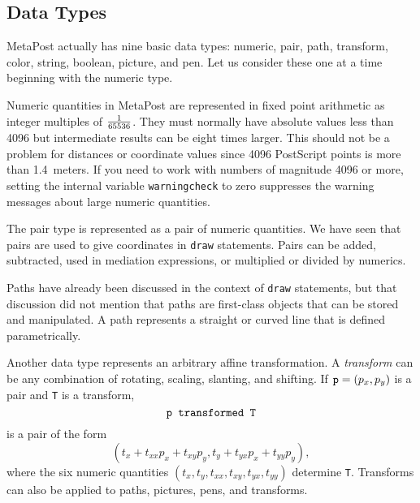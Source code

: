 \documentclass{article} %
\begin{document}
\subsection{Data Types}

MetaPost actually has nine basic data types: numeric,
pair, path, transform,
color, string, boolean, picture, and pen.  Let us consider these one at a time
beginning with the numeric type.

Numeric quantities in MetaPost are represented in fixed
point arithmetic as
integer multiples of $1\over65536$.  They must normally have absolute values
less than 4096 but intermediate results can be eight times larger.
This should not be a problem for distances or coordinate values since 4096
PostScript points is more than 1.4~meters.  If you need to work with numbers
of magnitude 4096 or more, setting the internal variable
{\tt warningcheck}\label{Dwarncheck} to zero
suppresses the warning messages about large numeric quantities.

The pair type is represented as a pair of numeric
quantities.  We have seen that pairs are used to give coordinates in
{\tt draw} statements.  Pairs can be added, subtracted, used in
mediation expressions, or multiplied or divided by numerics.

Paths have already been discussed in the context of {\tt draw}
statements, but
that discussion did not mention that paths are first-class objects that can be
stored and manipulated.  A path represents a straight or curved line that is
defined parametrically.

Another data type represents an arbitrary affine
transformation.  A {\em transform\/} can be any
combination of rotating, scaling, slanting, and shifting.  If ${\tt
p}=(p_x,p_y)$ is a pair and {\tt T} is a
transform,
$$ \hbox{\tt p transformed T} $$
is a pair of the form
$$ (t_x+t_{xx}p_x+t_{xy}p_y, t_y+t_{yx}p_x+t_{yy}p_y), $$
where the six numeric quantities $(t_x,t_y,t_{xx},t_{xy},t_{yx},t_{yy})$
determine {\tt T}.  Transforms can also be applied to paths, pictures, pens,
and transforms.
\end{document}
